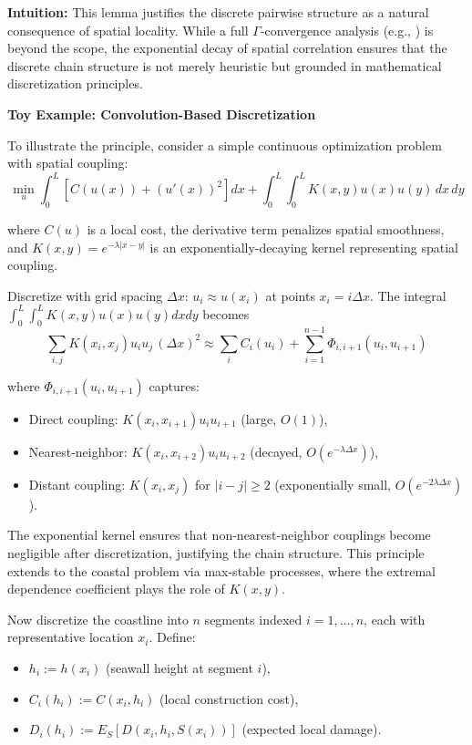 \documentclass[12pt]{article}
\theoremstyle{definition}
\begin{document}
\noindent\textbf{Intuition:} This lemma justifies the discrete pairwise structure as a natural consequence of spatial locality. While a full $\Gamma$-convergence analysis (e.g., \cite{Braides:Variational}) is beyond the scope, the exponential decay of spatial correlation ensures that the discrete chain structure is not merely heuristic but grounded in mathematical discretization principles.

\noindent\textbf{Toy Example: Convolution-Based Discretization}

To illustrate the principle, consider a simple continuous optimization problem with spatial coupling:
\[
\min_u \int_0^L \left[ C(u(x)) + (u'(x))^2 \right] dx + \int_0^L \int_0^L K(x, y) u(x) u(y) \, dx \, dy
\]

where $C(u)$ is a local cost, the derivative term penalizes spatial smoothness, and $K(x,y) = e^{-\lambda|x-y|}$ is an exponentially-decaying kernel representing spatial coupling.

Discretize with grid spacing $\Delta x$: $u_i \approx u(x_i)$ at points $x_i = i \Delta x$. The integral $\int_0^L \int_0^L K(x,y) u(x) u(y) dx dy$ becomes
\[
\sum_{i,j} K(x_i, x_j) u_i u_j \, (\Delta x)^2 \approx \sum_i C_i(u_i) + \sum_{i=1}^{n-1} \Phi_{i,i+1}(u_i, u_{i+1})
\]

where $\Phi_{i,i+1}(u_i, u_{i+1})$ captures:
\begin{itemize}
    \item Direct coupling: $K(x_i, x_{i+1}) u_i u_{i+1}$ (large, $O(1)$),
    \item Nearest-neighbor: $K(x_i, x_{i+2}) u_i u_{i+2}$ (decayed, $O(e^{-\lambda \Delta x})$),
    \item Distant coupling: $K(x_i, x_j)$ for $|i-j| \geq 2$ (exponentially small, $O(e^{-2\lambda\Delta x})$).
\end{itemize}

The exponential kernel ensures that non-nearest-neighbor couplings become negligible after discretization, justifying the chain structure. This principle extends to the coastal problem via max-stable processes, where the extremal dependence coefficient plays the role of $K(x,y)$.


\noindent Now discretize the coastline into $n$ segments indexed $i=1,\ldots,n$, each with representative location $x_i$. Define:
\begin{itemize}
    \item $h_i := h(x_i)$ (seawall height at segment $i$),
    \item $C_i(h_i) := C(x_i, h_i)$ (local construction cost),
    \item $D_i(h_i) := E_S[D(x_i, h_i, S(x_i))]$ (expected local damage).
\end{itemize}
\end{document}
